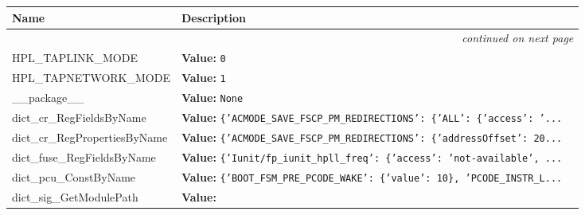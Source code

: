     \vspace{-1cm}
\hspace{\varindent}\begin{longtable}{|p{\varnamewidth}|p{\vardescrwidth}|l}
\cline{1-2}
\cline{1-2} \centering \textbf{Name} & \centering \textbf{Description}& \\
\cline{1-2}
\endhead\cline{1-2}\multicolumn{3}{r}{\small\textit{continued on next page}}\\\endfoot\cline{1-2}
\endlastfoot\raggedright H\-P\-L\-\_\-T\-A\-P\-L\-I\-N\-K\-\_\-M\-O\-D\-E\- & \raggedright \textbf{Value:} 
{\tt 0}&\\
\cline{1-2}
\raggedright H\-P\-L\-\_\-T\-A\-P\-N\-E\-T\-W\-O\-R\-K\-\_\-M\-O\-D\-E\- & \raggedright \textbf{Value:} 
{\tt 1}&\\
\cline{1-2}
\raggedright \_\-\_\-p\-a\-c\-k\-a\-g\-e\-\_\-\_\- & \raggedright \textbf{Value:} 
{\tt None}&\\
\cline{1-2}
\raggedright d\-i\-c\-t\-\_\-c\-r\-\_\-R\-e\-g\-F\-i\-e\-l\-d\-s\-B\-y\-N\-a\-m\-e\- & \raggedright \textbf{Value:} 
{\tt \texttt{\{}\texttt{'}\texttt{ACMODE\_SAVE\_FSCP\_PM\_REDIRECTIONS}\texttt{'}\texttt{: }\texttt{\{}\texttt{'}\texttt{ALL}\texttt{'}\texttt{: }\texttt{\{}\texttt{'}\texttt{access}\texttt{'}\texttt{: }\texttt{'}\texttt{...}}&\\
\cline{1-2}
\raggedright d\-i\-c\-t\-\_\-c\-r\-\_\-R\-e\-g\-P\-r\-o\-p\-e\-r\-t\-i\-e\-s\-B\-y\-N\-a\-m\-e\- & \raggedright \textbf{Value:} 
{\tt \texttt{\{}\texttt{'}\texttt{ACMODE\_SAVE\_FSCP\_PM\_REDIRECTIONS}\texttt{'}\texttt{: }\texttt{\{}\texttt{'}\texttt{addressOffset}\texttt{'}\texttt{: }20\texttt{...}}&\\
\cline{1-2}
\raggedright d\-i\-c\-t\-\_\-f\-u\-s\-e\-\_\-R\-e\-g\-F\-i\-e\-l\-d\-s\-B\-y\-N\-a\-m\-e\- & \raggedright \textbf{Value:} 
{\tt \texttt{\{}\texttt{'}\texttt{Iunit/fp\_iunit\_hpll\_freq}\texttt{'}\texttt{: }\texttt{\{}\texttt{'}\texttt{access}\texttt{'}\texttt{: }\texttt{'}\texttt{not-available}\texttt{'}\texttt{, }\texttt{...}}&\\
\cline{1-2}
\raggedright d\-i\-c\-t\-\_\-p\-c\-u\-\_\-C\-o\-n\-s\-t\-B\-y\-N\-a\-m\-e\- & \raggedright \textbf{Value:} 
{\tt \texttt{\{}\texttt{'}\texttt{BOOT\_FSM\_PRE\_PCODE\_WAKE}\texttt{'}\texttt{: }\texttt{\{}\texttt{'}\texttt{value}\texttt{'}\texttt{: }10\texttt{\}}\texttt{, }\texttt{'}\texttt{PCODE\_INSTR\_L}\texttt{...}}&\\
\cline{1-2}
\raggedright d\-i\-c\-t\-\_\-s\-i\-g\-\_\-G\-e\-t\-M\-o\-d\-u\-l\-e\-P\-a\-t\-h\- & \raggedright \textbf{Value:} 

\end{longtable}
